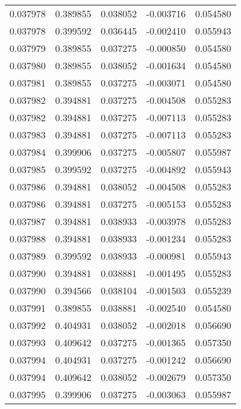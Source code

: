 \begin{tabular}{lrrrr}
0.037978    &  0.389855 &  0.038052 & -0.003716 &             0.054580 \\
0.037978    &  0.399592 &  0.036445 & -0.002410 &             0.055943 \\
0.037979    &  0.389855 &  0.037275 & -0.000850 &             0.054580 \\
0.037980    &  0.389855 &  0.038052 & -0.001634 &             0.054580 \\
0.037981    &  0.389855 &  0.037275 & -0.003071 &             0.054580 \\
0.037982    &  0.394881 &  0.037275 & -0.004508 &             0.055283 \\
0.037982    &  0.394881 &  0.037275 & -0.007113 &             0.055283 \\
0.037983    &  0.394881 &  0.037275 & -0.007113 &             0.055283 \\
0.037984    &  0.399906 &  0.037275 & -0.005807 &             0.055987 \\
0.037985    &  0.399592 &  0.037275 & -0.004892 &             0.055943 \\
0.037986    &  0.394881 &  0.038052 & -0.004508 &             0.055283 \\
0.037986    &  0.394881 &  0.037275 & -0.005153 &             0.055283 \\
0.037987    &  0.394881 &  0.038933 & -0.003978 &             0.055283 \\
0.037988    &  0.394881 &  0.038933 & -0.001234 &             0.055283 \\
0.037989    &  0.399592 &  0.038933 & -0.000981 &             0.055943 \\
0.037990    &  0.394881 &  0.038881 & -0.001495 &             0.055283 \\
0.037990    &  0.394566 &  0.038104 & -0.001503 &             0.055239 \\
0.037991    &  0.389855 &  0.038881 & -0.002540 &             0.054580 \\
0.037992    &  0.404931 &  0.038052 & -0.002018 &             0.056690 \\
0.037993    &  0.409642 &  0.037275 & -0.001365 &             0.057350 \\
0.037994    &  0.404931 &  0.037275 & -0.001242 &             0.056690 \\
0.037994    &  0.409642 &  0.038052 & -0.002679 &             0.057350 \\
0.037995    &  0.399906 &  0.037275 & -0.003063 &             0.055987 \\

\end{tabular}
